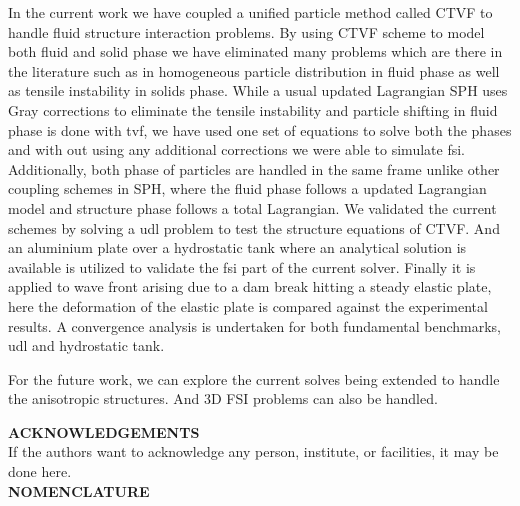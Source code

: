 \documentclass[10pt, conference]{FMFP2022}
\begin{document}
In the current work we have coupled a unified particle method called CTVF to
handle fluid structure interaction problems. By using CTVF scheme to model both
fluid and solid phase we have eliminated many problems which are there in the
literature such as in homogeneous particle distribution in fluid phase as well
as tensile instability in solids phase. While a usual updated Lagrangian SPH
uses Gray corrections to eliminate the tensile instability and particle shifting
in fluid phase is done with tvf, we have used one set of equations to solve both
the phases and with out using any additional corrections we were able to
simulate fsi. Additionally, both phase of particles are handled in the same
frame unlike other coupling schemes in SPH, where the fluid phase follows a
updated Lagrangian model and structure phase follows a total Lagrangian. We
validated the current schemes by solving a udl problem to test the structure
equations of CTVF. And an aluminium plate over a hydrostatic tank where an
analytical solution is available is utilized to validate the fsi part of the
current solver. Finally it is applied to wave front arising due to a dam break
hitting a steady elastic plate, here the deformation of the elastic plate is
compared against the experimental results. A convergence analysis is undertaken
for both fundamental benchmarks, udl and hydrostatic tank.

For the future work, we can explore the current solves being extended to handle
the anisotropic structures. And 3D FSI problems can also be handled.


\vspace{0.5cm}
\noindent
\textbf{ACKNOWLEDGEMENTS}\\
\noindent If the authors want to acknowledge any person, institute, or facilities, it may be done here. \\

\vspace{0.5cm}
 \noindent
\textbf{NOMENCLATURE}\\



\cite{wu2016coupled,
He2017coupled,
khayyer2018enhanced,
Sun2019study,
zhan2019stabilized,
wang2020scale,
ng2020coupled,
sun2021accurate,
khayyer2021multi,
long2021coupling,
peng2021coupling,
zhang2021deltasph,
sun2019fully,
hwang2014development,
zhang2021partitioned,
connor2021fluid,
nasar2019flexible,
khayyer2021coupled,
monaghan-gingold-stars-mnras-77,
sph:xsph:monaghan-jcp89,
sph:fsf:monaghan-jcp94,
zhang_hu_adams17,
PR:pysph:scipy16,
pysph,
pr:automan:2018,
monaghan-review:2005}



\end{document}
